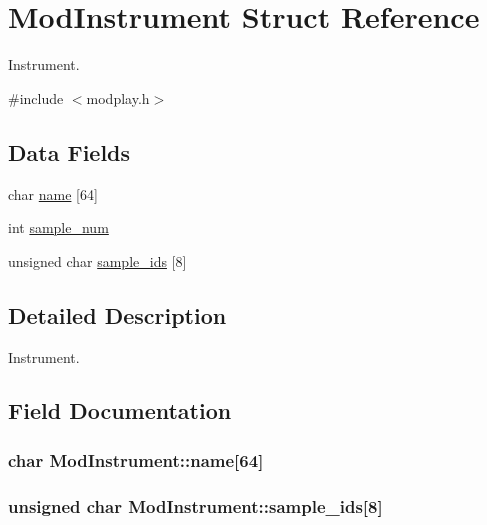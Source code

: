 \hypertarget{structModInstrument}{}\section{Mod\+Instrument Struct Reference}
\label{structModInstrument}


Instrument.  




{\ttfamily \#include $<$modplay.\+h$>$}

\subsection*{Data Fields}
\begin{DoxyCompactItemize}
\item 
char \hyperlink{structModInstrument_a8899319af20e4bed433fcc8f80443035}{name} \mbox{[}64\mbox{]}
\item 
int \hyperlink{structModInstrument_a573f5fd3a0901038aa7cf4594429a0ca}{sample\+\_\+num}
\item 
unsigned char \hyperlink{structModInstrument_a21ed8c8ded375bbd6edf8654502d1827}{sample\+\_\+ids} \mbox{[}8\mbox{]}
\end{DoxyCompactItemize}


\subsection{Detailed Description}
Instrument. 



\subsection{Field Documentation}
\hypertarget{structModInstrument_a8899319af20e4bed433fcc8f80443035}{}
\subsubsection[{name}]{\setlength{\rightskip}{0pt plus 5cm}char Mod\+Instrument\+::name\mbox{[}64\mbox{]}}\label{structModInstrument_a8899319af20e4bed433fcc8f80443035}
\hypertarget{structModInstrument_a21ed8c8ded375bbd6edf8654502d1827}{}
\subsubsection[{sample\+\_\+ids}]{\setlength{\rightskip}{0pt plus 5cm}unsigned char Mod\+Instrument\+::sample\+\_\+ids\mbox{[}8\mbox{]}}\label{structModInstrument_a21ed8c8ded375bbd6edf8654502d1827}
\hypertarget{structModInstrument_a573f5fd3a0901038aa7cf4594429a0ca}{}
